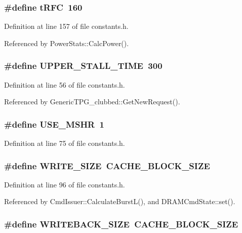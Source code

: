 \subsubsection[{tRFC}]{\setlength{\rightskip}{0pt plus 5cm}\#define tRFC~160}\label{constants_8h_376948a71afe1b5c8593d7aa91105bd9}




Definition at line 157 of file constants.h.

Referenced by PowerStats::CalcPower().
\subsubsection[{UPPER\_\-STALL\_\-TIME}]{\setlength{\rightskip}{0pt plus 5cm}\#define UPPER\_\-STALL\_\-TIME~300}\label{constants_8h_679becccea9f26318b5ea0998245dd4f}




Definition at line 56 of file constants.h.

Referenced by GenericTPG\_\-clubbed::GetNewRequest().
\subsubsection[{USE\_\-MSHR}]{\setlength{\rightskip}{0pt plus 5cm}\#define USE\_\-MSHR~1}\label{constants_8h_6021de24ebedf19345f1d5a34fc92c22}




Definition at line 75 of file constants.h.
\subsubsection[{WRITE\_\-SIZE}]{\setlength{\rightskip}{0pt plus 5cm}\#define WRITE\_\-SIZE~CACHE\_\-BLOCK\_\-SIZE}\label{constants_8h_dffc7bcd50015cae98ad6b1f3e240c03}




Definition at line 96 of file constants.h.

Referenced by CmdIssuer::CalculateBurstL(), and DRAMCmdState::set().
\subsubsection[{WRITEBACK\_\-SIZE}]{\setlength{\rightskip}{0pt plus 5cm}\#define WRITEBACK\_\-SIZE~CACHE\_\-BLOCK\_\-SIZE}\label{constants_8h_9117e1b8ef1ac1f3fea5da3f3b883c9d}





